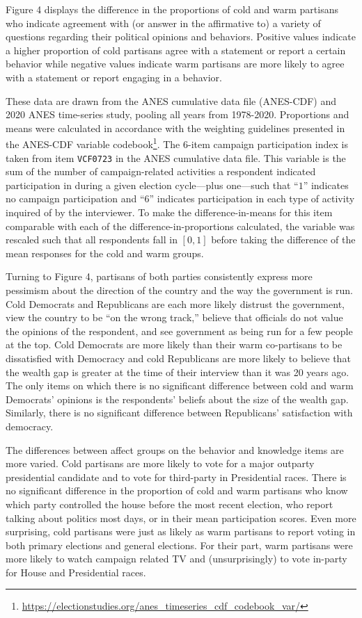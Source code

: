 \documentclass[
]{article}
\begin{document}
Figure 4 displays the difference in the proportions of cold and warm partisans who indicate agreement with (or answer in the affirmative to) a variety of questions regarding their political opinions and behaviors. Positive values indicate a higher proportion of cold partisans agree with a statement or report a certain behavior while negative values indicate warm partisans are more likely to agree with a statement or report engaging in a behavior.

These data are drawn from the ANES cumulative data file (ANES-CDF) and 2020 ANES time-series study, pooling all years from 1978-2020. Proportions and means were calculated in accordance with the weighting guidelines presented in the ANES-CDF variable codebook\footnote{\url{https://electionstudies.org/anes_timeseries_cdf_codebook_var/}}. The 6-item campaign participation index is taken from item \texttt{VCF0723} in the ANES cumulative data file. This variable is the sum of the number of campaign-related activities a respondent indicated participation in during a given election cycle---plus one---such that ``\(1\)'' indicates no campaign participation and ``\(6\)'' indicates participation in each type of activity inquired of by the interviewer. To make the difference-in-means for this item comparable with each of the difference-in-proportions calculated, the variable was rescaled such that all respondents fall in \([0,1]\) before taking the difference of the mean responses for the cold and warm groups.

Turning to Figure 4, partisans of both parties consistently express more pessimism about the direction of the country and the way the government is run. Cold Democrats and Republicans are each more likely distrust the government, view the country to be ``on the wrong track,'' believe that officials do not value the opinions of the respondent, and see government as being run for a few people at the top. Cold Democrats are more likely than their warm co-partisans to be dissatisfied with Democracy and cold Republicans are more likely to believe that the wealth gap is greater at the time of their interview than it was 20 years ago. The only items on which there is no significant difference between cold and warm Democrats' opinions is the respondents' beliefs about the size of the wealth gap. Similarly, there is no significant difference between Republicans' satisfaction with democracy.

The differences between affect groups on the behavior and knowledge items are more varied. Cold partisans are more likely to vote for a major outparty presidential candidate and to vote for third-party in Presidential races. There is no significant difference in the proportion of cold and warm partisans who know which party controlled the house before the most recent election, who report talking about politics most days, or in their mean participation scores. Even more surprising, cold partisans were just as likely as warm partisans to report voting in both primary elections and general elections. For their part, warm partisans were more likely to watch campaign related TV and (unsurprisingly) to vote in-party for House and Presidential races.
\end{document}
